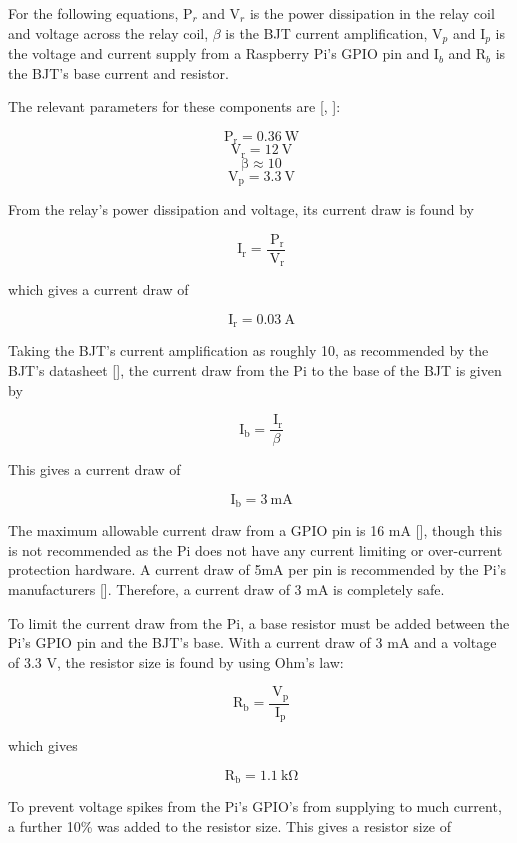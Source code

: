 For the following equations, P$_r$ and V$_r$ is the power dissipation in the relay coil
and voltage across the relay coil, $\beta$ is the BJT current amplification, V$_p$ and
I$_p$ is the voltage and current supply from a Raspberry Pi's GPIO pin and I$_b$ and
R$_b$ is the BJT's base current and resistor.

The relevant  parameters for these components are [\cite{manual:relay-specs},
\cite{maunual:transistor-datasheet}]:

\[ \mathrm{\ P_{r}} = 0.36\mathrm{\ W}\]
\[ \mathrm{\ V_{r}} = 12\mathrm{\ V}\]
\[ \mathrm{\ \beta} \approx 10\]
\[ \mathrm{\ V_{p}} = 3.3\mathrm{\ V}\]

From the relay's power dissipation and voltage, its current draw is found by

\[
\mathrm{\ I_{r}} = \frac{\mathrm{\ P_{r}}}{\mathrm{\ V_{r}}}
\]

which gives a current draw of

\[
\mathrm{\ I_{r}} = 0.03\mathrm{\ A}
\]

Taking the BJT's current amplification as roughly 10, as recommended by the
BJT's datasheet [\cite{maunual:transistor-datasheet}], the current draw from the
Pi to the base of the BJT is given by

\[
\mathrm{\ I_{b}} = \frac{\mathrm{\ I_{r}}}{\beta}
\]

This gives a current draw of

\[
\mathrm{\ I_{b}} = 3\mathrm{\ mA}
\]

The maximum allowable current draw from a GPIO pin is 16 mA
[\cite{website:gpio-specs}], though this is not recommended as the Pi does not
have any current limiting or over-current protection hardware. A current draw of 5mA per
pin is recommended by the Pi's manufacturers [\cite{website:gpio-specs}]. Therefore, a
current draw of 3 mA is completely safe.

To limit the current draw from the Pi, a base resistor must be added between the Pi's GPIO pin
and the BJT's base. With a current draw of 3 mA and a voltage of 3.3 V, the
resistor size is found by using Ohm's law:

\[
\mathrm{\ R_{b}} = \frac{\mathrm{\ V_{p}}}{\mathrm{\ I_{p}}}
\]

which gives

\[
\mathrm{\ R_{b}} = 1.1\mathrm{\ k\Omega}
\]

To prevent voltage spikes from the Pi's GPIO's from supplying to much current, a
further 10\% was added to the resistor size. This gives a resistor size of

